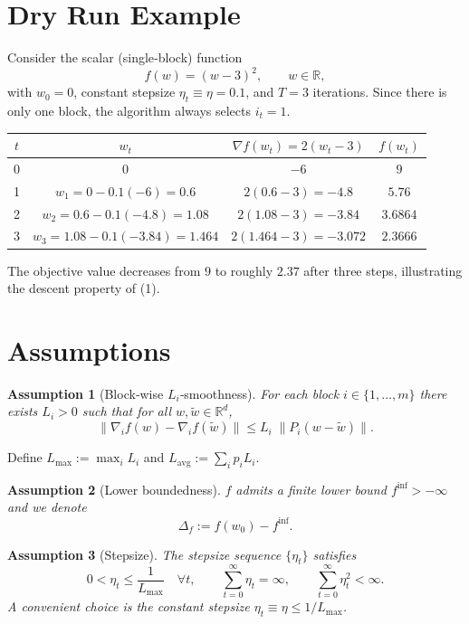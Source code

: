\documentclass{article}
\newtheorem{assumption}{Assumption}
\begin{document}
\section*{Dry Run Example}
Consider the scalar (single‑block) function
\[
f(w)=(w-3)^2,\qquad w\in\mathbb{R},
\]
with $w_0=0$, constant stepsize $\eta_t\equiv \eta=0.1$, and $T=3$ iterations.
Since there is only one block, the algorithm always selects $i_t=1$.

\begin{center}
\begin{tabular}{c|c|c|c}
$t$ & $w_t$ & $\nabla f(w_t)=2(w_t-3)$ & $f(w_t)$\\ \hline
0 & $0$ & $-6$ & $9$\\
1 & $w_1 = 0-0.1(-6)=0.6$ & $2(0.6-3)=-4.8$ & $5.76$\\
2 & $w_2 = 0.6-0.1(-4.8)=1.08$ & $2(1.08-3)=-3.84$ & $3.6864$\\
3 & $w_3 = 1.08-0.1(-3.84)=1.464$ & $2(1.464-3)=-3.072$ & $2.3666$\\
\end{tabular}
\end{center}
The objective value decreases from $9$ to roughly $2.37$ after three steps, illustrating the descent property of (1).

\section*{Assumptions}
\begin{assumption}[Block‑wise $L_i$‑smoothness]\label{ass:smooth}
For each block $i\in\{1,\dots ,m\}$ there exists $L_i>0$ such that for all $w,\tilde w\in\mathbb{R}^{d}$,
\[
\bigl\|\nabla_i f(w)-\nabla_i f(\tilde w)\bigr\|
\le L_i\;\bigl\|P_i(w-\tilde w)\bigr\|.
\tag{3}
\]
\end{assumption}
Define $L_{\max}:=\max_{i}L_i$ and $L_{\text{avg}}:=\sum_{i}p_i L_i$.

\begin{assumption}[Lower boundedness]\label{ass:lb}
$f$ admits a finite lower bound $f^{\inf}>-\infty$ and we denote
\[
\Delta_f:=f(w_0)-f^{\inf}.
\tag{4}
\]
\end{assumption}

\begin{assumption}[Stepsize]\label{ass:stepsize}
The stepsize sequence $\{\eta_t\}$ satisfies
\[
0<\eta_t\le\frac{1}{L_{\max}}\quad\forall t,
\qquad
\sum_{t=0}^{\infty}\eta_t=\infty,\qquad
\sum_{t=0}^{\infty}\eta_t^{2}<\infty .
\tag{5}
\]
A convenient choice is the constant stepsize $\eta_t\equiv\eta\le 1/L_{\max}$.
\end{assumption}
\end{document}
